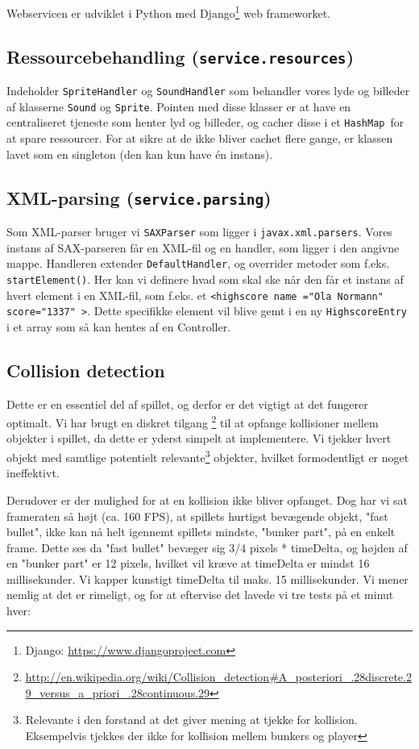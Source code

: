 \documentclass[titlepage,danish]{article}
\newcommand{\code}[1]{\texttt{#1}}
\begin{document}
Webservicen er udviklet i Python med Django\footnote{Django: \url{https://www.djangoproject.com}} web frameworket.

\subsection{Ressourcebehandling (\code{service.resources})}
Indeholder \code{SpriteHandler} og \code{SoundHandler} som behandler vores lyde og billeder af klasserne \code{Sound} og \code{Sprite}. Pointen med disse klasser er at have en centraliseret tjeneste som henter lyd og billeder, og cacher disse i et \code{HashMap}\ for at spare ressourcer. For at sikre at de ikke bliver cachet flere gange, er klassen lavet som en singleton (den kan kun have én instans).

\subsection{XML-parsing (\code{service.parsing})}
Som XML-parser bruger vi \code{SAXParser} som ligger i \code{javax.xml.parsers}. Vores instans af SAX-parseren får en XML-fil og en handler, som ligger i den angivne mappe. Handleren extender \code{DefaultHandler}, og overrider metoder som f.eks. \code{startElement()}. Her kan vi definere hvad som skal ske når den får et instans af hvert element i en XML-fil, som f.eks. et \code{\textless highscore name ="Ola Normann" score="1337" \textgreater}. Dette specifikke element vil blive gemt i en ny \code{HighscoreEntry} i et array som så kan hentes af en Controller.

\subsection{Collision detection}
Dette er en essentiel del af spillet, og derfor er det vigtigt at det fungerer optimalt. Vi har brugt en diskret tilgang \footnote{\url{http://en.wikipedia.org/wiki/Collision_detection\#A_posteriori_.28discrete.29_versus_a_priori_.28continuous.29}} til at opfange kollisioner mellem objekter i spillet, da dette er yderst simpelt at implementere. Vi tjekker hvert objekt med samtlige potentielt relevante\footnote{Relevante i den forstand at det giver mening at tjekke for kollision. Eksempelvis tjekkes der ikke for kollision mellem bunkers og player} objekter, hvilket formodentligt er noget ineffektivt.

Derudover er der mulighed for at en kollision ikke bliver opfanget. Dog har vi sat frameraten så højt (ca. 160 FPS), at spillets hurtigst bevægende objekt, "fast bullet", ikke kan nå helt igennemt spillets mindste, "bunker part", på en enkelt frame. Dette ses da  "fast bullet" bevæger sig 3/4 pixels * timeDelta, og højden af en "bunker part" er 12 pixels, hvilket vil kræve at timeDelta er mindst 16 millisekunder. Vi kapper kunstigt timeDelta til maks. 15 millisekunder. Vi mener nemlig at det er rimeligt, og for at eftervise det lavede vi tre tests på et minut hver:
\end{document}

